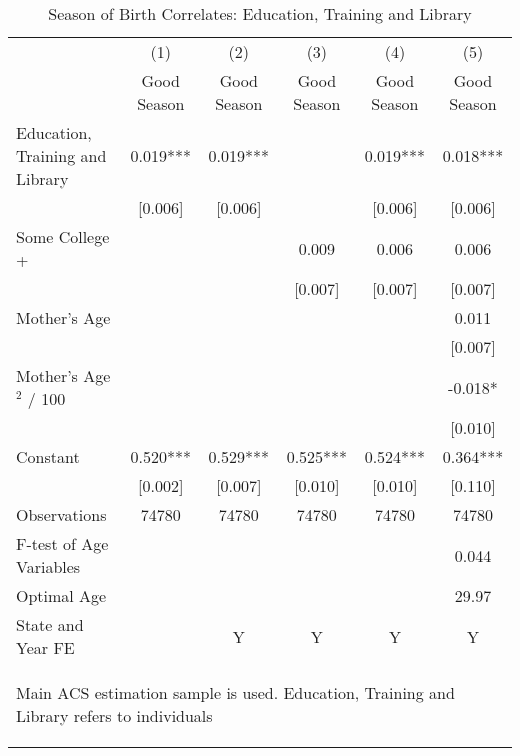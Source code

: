 \documentclass[a4paper, 11.5 pt]{article}
\theoremstyle{plain}
\begin{document}
\begin{doublespace}
\begin{table}[htbp]\centering
\def\sym#1{\ifmmode^{#1}\else\(^{#1}\)\fi}
\caption{Season of Birth Correlates: Education, Training and Library}
\begin{tabular}{l*{5}{c}}
\toprule
                    &\multicolumn{1}{c}{(1)}   &\multicolumn{1}{c}{(2)}   &\multicolumn{1}{c}{(3)}   &\multicolumn{1}{c}{(4)}   &\multicolumn{1}{c}{(5)}   \\
                    & Good Season   & Good Season   & Good Season   & Good Season   & Good Season   \\
\midrule
Education, Training and Library&       0.019***&       0.019***&               &       0.019***&       0.018***\\
                    &     [0.006]   &     [0.006]   &               &     [0.006]   &     [0.006]   \\
Some College +      &               &               &       0.009   &       0.006   &       0.006   \\
                    &               &               &     [0.007]   &     [0.007]   &     [0.007]   \\
Mother's Age        &               &               &               &               &       0.011   \\
                    &               &               &               &               &     [0.007]   \\
Mother's Age$^2$ / 100&               &               &               &               &      -0.018*  \\
                    &               &               &               &               &     [0.010]   \\
Constant            &       0.520***&       0.529***&       0.525***&       0.524***&       0.364***\\
                    &     [0.002]   &     [0.007]   &     [0.010]   &     [0.010]   &     [0.110]   \\
\midrule
Observations        &       74780   &       74780   &       74780   &       74780   &       74780   \\
F-test of Age Variables &  &    &     &     &0.044\\
Optimal Age             &  &    &     &     &29.97\\
State and Year FE&&Y&Y&Y&Y\\                        \bottomrule
\multicolumn{6}{p{17cm}}{\begin{footnotesize}Main ACS estimation
sample is used. Education, Training and Library refers to individuals

\end{footnotesize}}
\end{tabular}
\end{table}
\end{doublespace}
\end{document}
